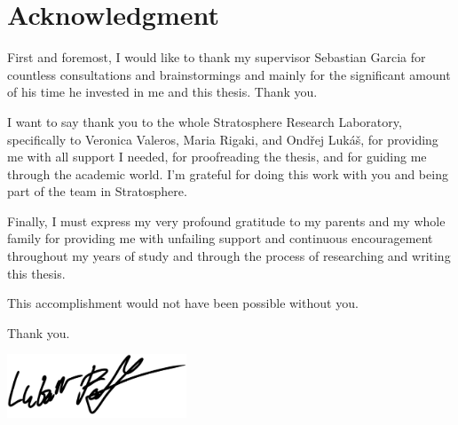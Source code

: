 \vspace*{\fill}

\section*{Acknowledgment}
First and foremost, I would like to thank my supervisor Sebastian Garcia for countless consultations and brainstormings and mainly for the significant amount of his time he invested in me and this thesis. Thank you.

I want to say thank you to the whole Stratosphere Research Laboratory, specifically to Veronica Valeros, Maria Rigaki, and Ondřej Lukáš, for providing me with all support I needed, for proofreading the thesis, and for guiding me through the academic world.
I'm grateful for doing this work with you and being part of the team in Stratosphere.

Finally, I must express my very profound gratitude to my parents and my whole family for providing me with unfailing support and continuous encouragement throughout my years of study and through the process of researching and writing this thesis. 

\bigskip \noindent
This accomplishment would not have been possible without you.
  
\bigskip \noindent
Thank you.
  
\bigskip \noindent
\hspace*{0.6\textwidth} \includegraphics[width=0.4\textwidth]{assets/signature.png}

\thispagestyle{empty}

\cleardoublepage